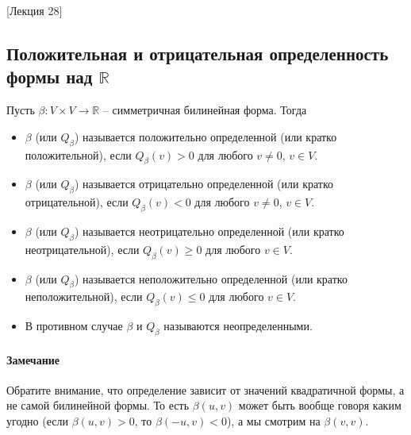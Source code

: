 [Лекция 28]


\subsection{Положительная и отрицательная определенность формы над $\mathbb R$}

\begin{definition}
Пусть $\beta\colon V\times V\to \mathbb R$ -- симметричная билинейная форма.
Тогда
\begin{itemize}
\item $\beta$ (или $Q_\beta$) называется положительно определенной (или кратко положительной), если $Q_\beta(v) > 0$ для любого $v\neq 0$, $v\in V$.

\item $\beta$ (или $Q_\beta$) называется отрицательно определенной (или кратко отрицательной), если $Q_\beta(v) < 0$ для любого $v\neq 0$, $v\in V$.

\item $\beta$ (или $Q_\beta$) называется неотрицательно определенной (или кратко неотрицательной), если $Q_\beta(v) \geqslant 0$ для любого $v\in V$.

\item $\beta$ (или $Q_\beta$) называется неположительно определенной (или кратко неположительной), если $Q_\beta(v) \leqslant 0$ для любого $v\in V$.

\item В противном случае $\beta$ и $Q_\beta$ называются неопределенными.
\end{itemize}
\end{definition}

\paragraph{Замечание}

Обратите внимание, что определение зависит от значений квадратичной формы, а не самой билинейной формы.
То есть $\beta(u,v)$ может быть вообще говоря каким угодно (если $\beta(u, v) >0$, то $\beta(-u, v)< 0$), а мы смотрим на $\beta(v, v)$.


